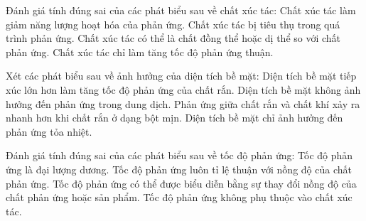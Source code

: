 \documentclass[Main.tex]{subfiles}
\begin{document}
\begin{ex}
	Đánh giá tính đúng sai của các phát biểu sau về chất xúc tác:
	\choiceTF
	{\True Chất xúc tác làm giảm năng lượng hoạt hóa của phản ứng.}
	{Chất xúc tác bị tiêu thụ trong quá trình phản ứng.}
	{\True Chất xúc tác có thể là chất đồng thể hoặc dị thể so với chất phản ứng.}
	{Chất xúc tác chỉ làm tăng tốc độ phản ứng thuận.}
\end{ex}
\begin{ex}
	Xét các phát biểu sau về ảnh hưởng của diện tích bề mặt:
	\choiceTF
	{\True Diện tích bề mặt tiếp xúc lớn hơn làm tăng tốc độ phản ứng của chất rắn.}
	{Diện tích bề mặt không ảnh hưởng đến phản ứng trong dung dịch.}
	{\True Phản ứng giữa chất rắn và chất khí xảy ra nhanh hơn khi chất rắn ở dạng bột mịn.}
	{Diện tích bề mặt chỉ ảnh hưởng đến phản ứng tỏa nhiệt.}
\end{ex}
\begin{ex}
	Đánh giá tính đúng sai của các phát biểu sau về tốc độ phản ứng:
	\choiceTF
	{\True Tốc độ phản ứng là đại lượng dương.}
	{Tốc độ phản ứng luôn tỉ lệ thuận với nồng độ của chất phản ứng.}
	{\True Tốc độ phản ứng có thể được biểu diễn bằng sự thay đổi nồng độ của chất phản ứng hoặc sản phẩm.}
	{Tốc độ phản ứng không phụ thuộc vào chất xúc tác.}
\end{ex}
\end{document}
